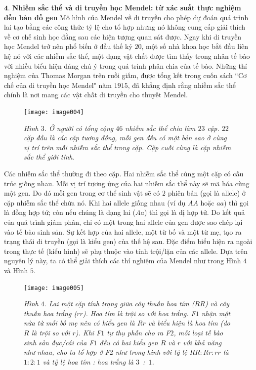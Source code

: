 \begin{multicols}{2}
	\vskip 0.1cm
	$\pmb{4.}$ \textbf{\color{timhieukhoahoc}Nhiễm sắc thể và di truyền học Mendel: từ xác suất thực nghiệm đến bản đồ gen}
	\vskip 0.1cm
	Mô hình của Mendel về di truyền cho phép dự đoán quá trình lai tạo bằng các công thức tỷ lệ cho tổ hợp nhưng nó không cung cấp giải thích về cơ chế sinh học đằng sau các hiện tượng quan sát được. Ngay khi di truyền học Mendel trở nên phổ biến ở đầu thế kỷ $20$, một số nhà khoa học bắt đầu liên hệ nó với các nhiễm sắc thể, một dạng vật chất được tìm thấy trong nhân tế bào với nhiều biểu hiện đáng chú ý trong quá trình phân chia của tế bào.
	\vskip 0.1cm
	Những thí nghiệm của Thomas Morgan trên ruồi giấm, được tổng kết trong cuốn sách ``Cơ chế của di truyền học Mendel" năm $1915$, đã khẳng định rằng nhiễm sắc thể chính là nơi mang các vật chất di truyền cho thuyết Mendel.
	\begin{figure}[H]
		\centering
		\vspace*{-5pt}
		\captionsetup{labelformat= empty, justification=centering}
		\texttt{[image: image004]}
		\caption{\small\textit{\color{timhieukhoahoc}Hình $3$. Ở người có tổng cộng $46$ nhiễm sắc thể chia làm $23$ cặp. $22$ cặp đầu là các cặp tương đồng, mỗi gen đều có một bản sao ở cùng vị trí trên mỗi nhiễm sắc thể trong cặp. Cặp cuối cùng là cặp nhiễm sắc thể giới tính.}}
		\vspace*{-10pt}
	\end{figure}
	Các nhiễm sắc thể thường đi theo cặp. Hai nhiễm sắc thể cùng một cặp có cấu trúc giống nhau. Mỗi vị trí tương ứng của hai nhiễm sắc thể này sẽ mã hóa cùng một gen. Do đó mỗi gen trong cơ thể sinh vật sẽ có $2$ phiên bản (gọi là allele) ở cặp nhiễm sắc thể chứa nó. Khi hai allele giống nhau (ví dụ $AA$ hoặc $aa$) thì gọi là đồng hợp tử; còn nếu chúng là dạng lai ($Aa$) thì gọi là dị hợp tử.
	\vskip 0.1cm 
	Do kết quả của quá trình giảm phân, chỉ có một trong hai allele của gen được sao chép lại vào tế bào sinh sản. Sự kết hợp của hai allele, một từ bố và một từ mẹ, tạo ra trạng thái di truyền (gọi là kiểu gen) của thế hệ sau. Đặc điểm biểu hiện ra ngoài trong thực tế (kiểu hình) sẽ phụ thuộc vào tính trội/lặn của các allele. Dựa trên nguyên lý này, ta có thể giải thích các thí nghiệm của Mendel như trong Hình $4$ và Hình $5$.  
	\begin{figure}[H]
		\centering
		\captionsetup{labelformat= empty, justification=centering}
		\texttt{[image: image005]}
		\caption{\small\textit{\color{timhieukhoahoc}Hình $4$. Lai một cặp tính trạng giữa cây thuần hoa tím ($RR$) và cây thuần hoa trắng ($rr$). Hoa tím là trội so với hoa trắng. F$1$ nhận một nửa từ mỗi bố mẹ nên có kiểu gen là $Rr$ và biểu hiện là hoa tím (do $R$ là trội so với $r$). Khi F$1$ tự thụ phấn cho ra F$2$, mỗi loại tế bào sinh sản đực/cái của F$1$ đều có hai kiểu gen $R$ và $r$ với khả năng như nhau, cho ta tổ hợp ở F$2$ như trong hình với tỷ lệ $RR : Rr : rr$ là $1 : 2 :1$ và tỷ lệ hoa tím : hoa trắng là $3$~:~$1$.}}

\end{figure}
\end{multicols}
